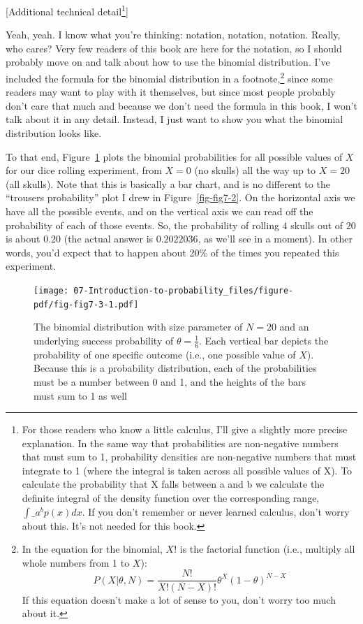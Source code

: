\documentclass[
  a4paper,
]{book}
\begin{document}
{[}Additional technical detail\footnote{For those readers who know a
  little calculus, I'll give a slightly more precise explanation. In the
  same way that probabilities are non-negative numbers that must sum to
  1, probability densities are non-negative numbers that must integrate
  to 1 (where the integral is taken across all possible values of X). To
  calculate the probability that X falls between a and b we calculate
  the definite integral of the density function over the corresponding
  range, \(\int\_{a}^{b} p(x) dx\). If you don't remember or never
  learned calculus, don't worry about this. It's not needed for this
  book.}{]}

Yeah, yeah. I know what you're thinking: notation, notation, notation.
Really, who cares? Very few readers of this book are here for the
notation, so I should probably move on and talk about how to use the
binomial distribution. I've included the formula for the binomial
distribution in a footnote,\footnote{In the equation for the binomial,
  \(X!\) is the factorial function (i.e., multiply all whole numbers
  from 1 to \(X\)):
  \[P(X | \theta, N) = \displaystyle\frac{N!}{X! (N-X)!} \theta^X (1-\theta)^{N-X}\]
  If this equation doesn't make a lot of sense to you, don't worry too
  much about it.} since some readers may want to play with it
themselves, but since most people probably don't care that much and
because we don't need the formula in this book, I won't talk about it in
any detail. Instead, I just want to show you what the binomial
distribution looks like.

To that end, Figure~\ref{fig-fig7-3} plots the binomial probabilities
for all possible values of \(X\) for our dice rolling experiment, from
\(X = 0\) (no skulls) all the way up to \(X = 20\) (all skulls). Note
that this is basically a bar chart, and is no different to the
``trousers probability'' plot I drew in Figure~\ref{fig-fig7-2}. On the
horizontal axis we have all the possible events, and on the vertical
axis we can read off the probability of each of those events. So, the
probability of rolling \(4\) skulls out of \(20\) is about \(0.20\) (the
actual answer is \(0.2022036\), as we'll see in a moment). In other
words, you'd expect that to happen about 20\% of the times you repeated
this experiment.

\begin{figure}

\texttt{[image: 07-Introduction-to-probability\_files/figure-pdf/fig-fig7-3-1.pdf]} \hfill{}

\caption{\label{fig-fig7-3}The binomial distribution with size parameter
of \(N = 20\) and an underlying success probability of
\(\theta = \frac{1}{6}\). Each vertical bar depicts the probability of
one specific outcome (i.e., one possible value of \(X\)). Because this
is a probability distribution, each of the probabilities must be a
number between 0 and 1, and the heights of the bars must sum to 1 as
well}

\end{figure}
\end{document}
